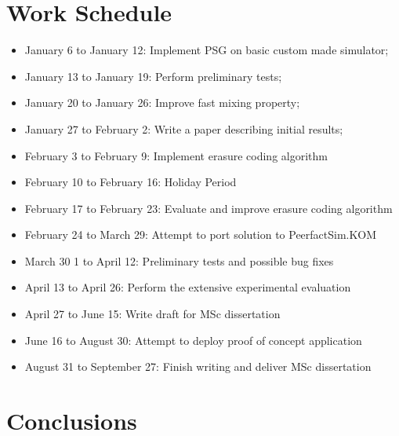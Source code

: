 \documentclass[runningheads]{llncs}
\begin{document}
\section{Work Schedule}\label{sec:workschedule}
\begin{itemize}
    \item January 6 to January 12: Implement PSG on basic custom made simulator;
    \item January 13 to January 19: Perform preliminary tests;
    \item January 20 to January 26: Improve fast mixing property;
    \item January 27 to February 2: Write a paper describing initial results;
    \item February 3 to February 9: Implement erasure coding algorithm
    \item February 10 to February 16: Holiday Period
    \item February 17 to February 23: Evaluate and improve erasure coding algorithm
    \item February 24 to March 29: Attempt to port solution to PeerfactSim.KOM
    \item March 30 1 to April 12: Preliminary tests and possible bug fixes
    \item April 13 to April 26: Perform the extensive experimental evaluation
    \item April 27 to June 15: Write draft for MSc dissertation
    \item June 16 to August 30: Attempt to deploy proof of concept application
    \item August 31 to September 27: Finish writing and deliver MSc dissertation
\end{itemize}

\section{Conclusions}\label{sec:conclusion}

\newpage


\end{document}
